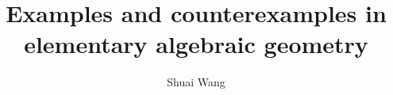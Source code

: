 \documentclass[../main.tex]{subfiles}
\begin{document}
\title[Examples and counterexamples in elementary algebraic geometry]{Examples and counterexamples in elementary algebraic geometry}
\author{Shuai Wang}
\end{document}

